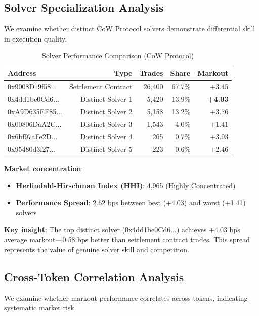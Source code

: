 \documentclass[12pt,a4paper]{article}
\begin{document}
\subsection{Solver Specialization Analysis}

We examine whether distinct CoW Protocol solvers demonstrate differential skill in execution quality.

\begin{table}[H]
\centering
\caption{Solver Performance Comparison (CoW Protocol)}
\label{tab:solver_spec}
\begin{tabular}{lrrrr}
\toprule
\textbf{Address} & \textbf{Type} & \textbf{Trades} & \textbf{Share} & \textbf{Markout} \\
\midrule
0x9008D19f58... & Settlement Contract & 26,400 & 67.7\% & +3.45 \\
0x4dd1be0Cd6... & Distinct Solver 1 & 5,420 & 13.9\% & \textbf{+4.03} \\
0xA9D635EF85... & Distinct Solver 2 & 5,158 & 13.2\% & +3.76 \\
0x00806DaA2C... & Distinct Solver 3 & 1,543 & 4.0\% & +1.41 \\
0x6bf97aFe2D... & Distinct Solver 4 & 265 & 0.7\% & +3.93 \\
0x95480d3f27... & Distinct Solver 5 & 223 & 0.6\% & +2.46 \\
\bottomrule
\end{tabular}
\end{table}

\textbf{Market concentration}:
\begin{itemize}
    \item \textbf{Herfindahl-Hirschman Index (HHI)}: 4,965 (Highly Concentrated)
    \item \textbf{Performance Spread}: 2.62 bps between best (+4.03) and worst (+1.41) solvers
\end{itemize}

\textbf{Key insight}: The top distinct solver (0x4dd1be0Cd6...) achieves +4.03 bps average markout---0.58 bps better than settlement contract trades. This spread represents the value of genuine solver skill and competition.

\subsection{Cross-Token Correlation Analysis}

We examine whether markout performance correlates across tokens, indicating systematic market risk.
\end{document}
